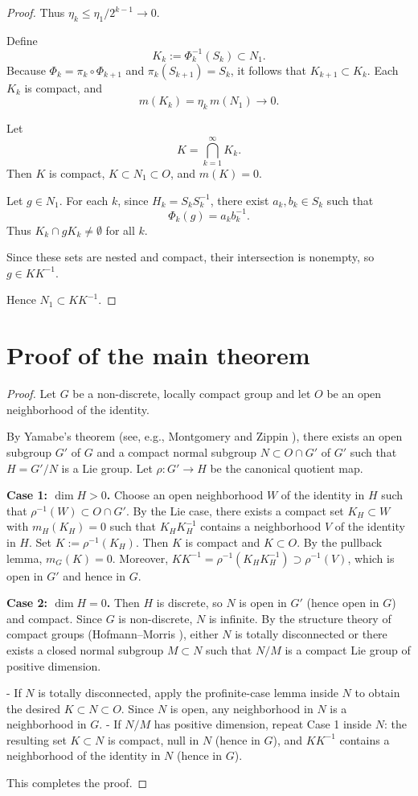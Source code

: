 \documentclass[12pt]{amsart}
\begin{document}
\begin{proof}
Thus \(\eta_k \le \eta_1 / 2^{k-1} \to 0\).

Define
\[
K_k := \Phi_k^{-1}(S_k) \subset N_1.
\]
Because \(\Phi_k = \pi_k \circ \Phi_{k+1}\) and \(\pi_k(S_{k+1}) = S_k\), it follows that \(K_{k+1} \subset K_k\). Each \(K_k\) is compact, and
\[
m(K_k) = \eta_k\, m(N_1) \to 0.
\]

Let
\[
K = \bigcap_{k=1}^\infty K_k.
\]
Then \(K\) is compact, \(K \subset N_1 \subset O\), and \(m(K)=0\).

Let \(g \in N_1\). For each \(k\), since \(H_k = S_k S_k^{-1}\),
there exist \(a_k, b_k \in S_k\) such that
\[
\Phi_k(g) = a_k b_k^{-1}.
\]
Thus \(K_k \cap gK_k \neq \emptyset\) for all \(k\).

Since these sets are nested and compact, their intersection is nonempty,
so \(g \in KK^{-1}\).

Hence \(N_1 \subset KK^{-1}\).
\end{proof}

\section{Proof of the main theorem}

\begin{proof}
Let \(G\) be a non-discrete, locally compact group and let \(O\)
be an open neighborhood of the identity.

By Yamabe's theorem (see, e.g., Montgomery and Zippin \cite[Section~4.6]{MZ}),
there exists an open subgroup \(G'\) of \(G\) and a compact normal subgroup \(N\subset O\cap G'\) of \(G'\)
such that \(H = G'/N\) is a Lie group. Let \(\rho : G' \to H\) be the canonical quotient map.

\textbf{Case 1: \(\dim H > 0\).}
Choose an open neighborhood \(W\) of the identity in \(H\) such that \(\rho^{-1}(W) \subset O \cap G'\).
By the Lie case, there exists a compact set \(K_H \subset W\) with \(m_H(K_H)=0\) such that \(K_H K_H^{-1}\) contains a neighborhood \(V\) of the identity in \(H\).
Set \(K := \rho^{-1}(K_H)\). Then \(K\) is compact and \(K \subset O\).
By the pullback lemma, \(m_G(K)=0\).
Moreover, \(KK^{-1} = \rho^{-1}(K_H K_H^{-1}) \supset \rho^{-1}(V)\), which is open in \(G'\) and hence in \(G\).

\textbf{Case 2: \(\dim H = 0\).}
Then \(H\) is discrete, so \(N\) is open in \(G'\) (hence open in \(G\)) and compact.
Since \(G\) is non-discrete, \(N\) is infinite.
By the structure theory of compact groups (Hofmann–Morris \cite[Chapter 9]{HM}), either \(N\) is totally disconnected or there exists a closed normal subgroup \(M \subset N\) such that \(N/M\) is a compact Lie group of positive dimension.

- If \(N\) is totally disconnected, apply the profinite-case lemma inside \(N\) to obtain the desired \(K \subset N \subset O\).
  Since \(N\) is open, any neighborhood in \(N\) is a neighborhood in \(G\).
- If \(N/M\) has positive dimension, repeat Case 1 inside \(N\): the resulting set \(K \subset N\) is compact, null in \(N\) (hence in \(G\)), and \(KK^{-1}\) contains a neighborhood of the identity in \(N\) (hence in \(G\)).

This completes the proof.
\end{proof}
\end{document}
